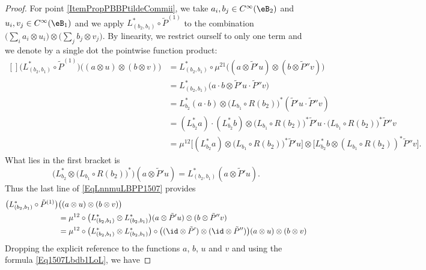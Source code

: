 \begin{proof}
	For point \ref{ItemPropPBBPtildeCommii}, we take $a_i,b_j\in C^{\infty}(\eB_2)$ and $u_i,v_j\in C^{\infty}(\eB_1)$ and we apply $L^*_{(b_2,b_1)}\circ \tilde P^{(1)}$ to the combination $\big( \sum_ia_i\otimes u_i \big)\otimes\big( \sum_j b_j\otimes v_j \big)$. By linearity, we restrict ourself to only one term and we denote by a single dot the pointwise function product:
	\begin{equation}	\label{EqLnnmuLBPP1507}
		\begin{aligned}[]
			\big( L^*_{(b_2,b_1)}\circ\tilde P^{(1)} \big)\big( (a\otimes u)\otimes (b\otimes v) \big)&=
			L^*_{(b_2,b_1)}\circ\mu^{21}\big( (a\otimes \tilde P'u)\otimes(b\otimes \tilde P''v) \big)\\
			&=L^*_{(b_2,b_1)}\big( a\cdot b\otimes \tilde P'u\cdot\tilde P''v \big)\\
			&=L^*_{b_2}(a\cdot b)\otimes \big( L_{b_1}\circ R(b_2) \big)^*(\tilde P'u\cdot \tilde P''v)\\
			&=(L^*_{b_2}a)\cdot(L^*_{b_2}b)\otimes \big( L_{b_1}\circ R(b_2) \big)^*\tilde P'u\cdot \big( L_{b_1}\circ R(b_2) \big)^*\tilde P''v\\
			&=\mu^{12}\Big[ (L^*_{b_2}a)\otimes\big( L_{b_1}\circ R(b_2) \big)^*\tilde P'u \Big]\otimes\Big[ L^*_{b_2}b\otimes(L_{b_1}\circ R(b_2))^*\tilde P''v \Big].
		\end{aligned}
	\end{equation}
	What lies in the first bracket is
	\begin{equation}
		\Big( L^*_{b_2}\otimes\big( L_{b_1}\circ R(b_2) \big)^* \Big)(a\otimes \tilde P'u)=L_{(b_2,b_1)}^*(a\otimes \tilde P'u).
	\end{equation}
	Thus the last line of \eqref{EqLnnmuLBPP1507} provides
	\begin{equation}
		\begin{aligned}[]
			\big( L^*_{(b_2,b_1)}\circ\tilde P^{(1)} \big)&\big( (a\otimes u)\otimes (b\otimes v) \big)\\
			&=\mu^{12}\circ\big( L^*_{(b_2,b_1)}\otimes L^*_{(b_2,b_1)} \big)(a\otimes \tilde P'u)\otimes(b\otimes \tilde P''v)\\
			&=\mu^{12}\circ\big( L^*_{(b_2,b_1)}\otimes L^*_{(b_2,b_1)} \big)\circ\big( (\id\otimes\tilde P')\otimes(\id\otimes\tilde P'') \big)(a\otimes u)\otimes(b\otimes v)
		\end{aligned}
	\end{equation}
	Dropping the explicit reference to the functions $a$, $b$, $u$ and $v$ and using the formula \eqref{Eq1507Lbdb1LoL}, we have

\end{proof}
